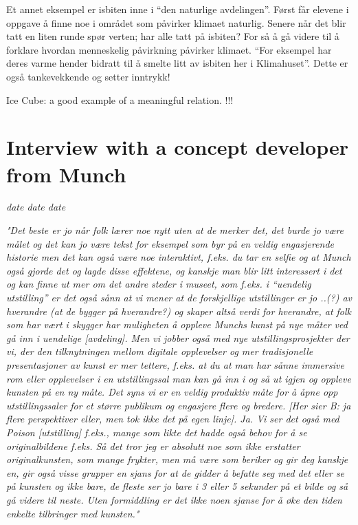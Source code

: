 Et annet eksempel er isbiten inne i “den naturlige avdelingen”.  Først får elevene i oppgave å finne noe i området som påvirker klimaet naturlig. Senere når det blir tatt en liten runde spør verten; har alle tatt på isbiten? For så å gå videre til å forklare hvordan menneskelig påvirkning påvirker klimaet. “For eksempel har deres varme hender bidratt til å smelte litt av isbiten her i Klimahuset”. Dette er også tankevekkende og setter inntrykk!


Ice Cube: a good example of a meaningful relation. !!!


\section{Interview with a concept developer from Munch}
\par
\emph{date date date}
\par


\emph{"Det beste er jo når folk lærer noe nytt uten at de merker det, det burde jo være målet og det kan jo være tekst for eksempel som byr på en veldig engasjerende historie men det kan også være noe interaktivt, f.eks. du tar en selfie og at Munch også gjorde det og lagde disse effektene, og kanskje man blir litt interessert i det og kan finne ut mer om det andre steder i museet, som f.eks. i “uendelig utstilling” er det også sånn at vi mener at de forskjellige utstillinger er jo ..(?) av hverandre (at de bygger på hverandre?) og skaper altså verdi for hverandre, at folk som har vært i skygger har muligheten å oppleve Munchs kunst på nye måter ved gå inn i uendelige [avdeling]. Men vi jobber også med nye utstillingsprosjekter der vi, der den tilknytningen mellom digitale opplevelser og mer tradisjonelle presentasjoner av kunst er mer tettere, f.eks. at du at man har sånne immersive rom eller opplevelser i en utstillingssal man kan gå inn i og så ut igjen og oppleve kunsten på en ny måte. Det syns vi er en veldig produktiv måte for å åpne opp utstillingssaler for et større publikum og engasjere flere og bredere. [Her sier B: ja flere perspektiver eller, men tok ikke det på egen linje]. Ja. Vi ser det også med Poison [utstilling] f.eks., mange som likte det hadde også behov for å se originalbildene f.eks. Så det tror jeg er absolutt noe som ikke erstatter originalkunsten, som mange frykter, men må være som beriker og gir deg kanskje en, gir også visse grupper en sjans for at de gidder å befatte seg med det eller se på kunsten og ikke bare, de fleste ser jo bare i 3 eller 5 sekunder på et bilde og så gå videre til neste. Uten formiddling er det ikke noen sjanse for å øke den tiden enkelte tilbringer med kunsten."}

